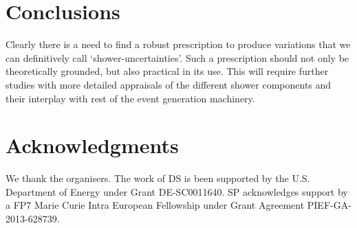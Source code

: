 \section{Conclusions}
\label{sec:psunc:conclusions}
Clearly there is a need to find a robust prescription to produce variations that we can definitively call `shower-uncertainties'. Such a prescription should not only be theoretically grounded, but also practical in its use. This will require further studies with more detailed appraisals of the different shower components and their interplay with rest of the event generation machinery. 

\section*{Acknowledgments}

We thank the organisers.
The work of DS is been supported by the U.S. Department of Energy under Grant
DE-SC0011640.
SP acknowledges support by a FP7 Marie Curie Intra European
Fellowship under Grant Agreement PIEF-GA-2013-628739.
